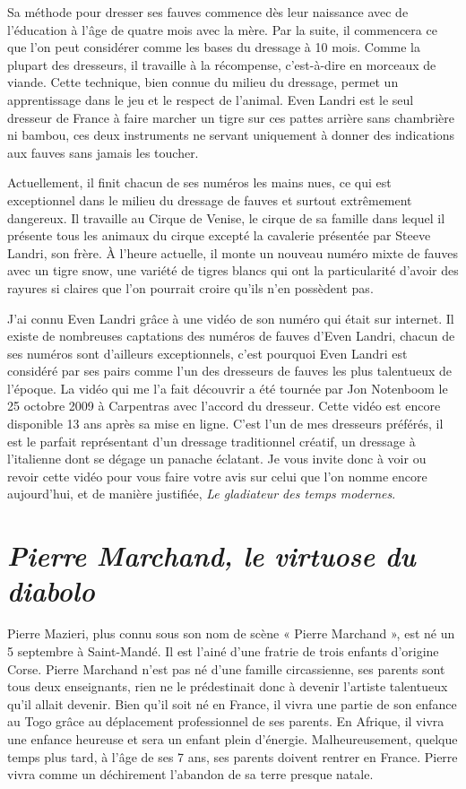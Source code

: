 Sa méthode pour dresser ses fauves commence dès leur naissance avec de l'éducation à l'âge de quatre mois avec la mère. Par la suite, il commencera ce que l'on peut considérer comme les bases du dressage à 10 mois. Comme la plupart des dresseurs, il travaille à la récompense, c'est-à-dire en morceaux de viande. Cette technique, bien connue du milieu du dressage, permet un apprentissage dans le jeu et le respect de l'animal. Even Landri est le seul dresseur de France à faire marcher un tigre sur ces pattes arrière sans chambrière ni bambou, ces deux instruments ne servant uniquement à donner des indications aux fauves sans jamais les toucher.

Actuellement, il finit chacun de ses numéros les mains nues, ce qui est exceptionnel dans le milieu du dressage de fauves et surtout extrêmement dangereux. Il travaille au Cirque de Venise, le cirque de sa famille dans lequel il présente tous les animaux du cirque excepté la cavalerie présentée par Steeve Landri, son frère. À l'heure actuelle, il monte un nouveau numéro mixte de fauves avec un tigre snow, une variété de tigres blancs qui ont la particularité d'avoir des rayures si claires que l'on pourrait croire qu'ils n'en possèdent pas.

J'ai connu Even Landri grâce à une vidéo de son numéro qui était sur internet. Il existe de nombreuses captations des numéros de fauves d'Even Landri, chacun de ses numéros sont d'ailleurs exceptionnels, c'est pourquoi Even Landri est considéré par ses pairs comme l'un des dresseurs de fauves les plus talentueux de l'époque. La vidéo qui me l'a fait découvrir a été tournée par Jon Notenboom le 25 octobre 2009 à Carpentras avec l'accord du dresseur. Cette vidéo est encore disponible 13 ans après sa mise en ligne. C'est l'un de mes dresseurs préférés, il est le parfait représentant d'un dressage traditionnel créatif, un dressage à l'italienne dont se dégage un panache éclatant. Je vous invite donc à voir ou revoir cette vidéo pour vous faire votre avis sur celui que l’on nomme encore aujourd'hui, et de manière justifiée, \textit{Le gladiateur des temps modernes}.

\section*{\textit{Pierre Marchand, le virtuose du diabolo}}
{}

Pierre Mazieri, plus connu sous son nom de scène « Pierre Marchand », est né un 5 septembre à Saint-Mandé. Il est l'ainé d'une fratrie de trois enfants d'origine Corse. Pierre Marchand n'est pas né d'une famille circassienne, ses parents sont tous deux enseignants, rien ne le prédestinait donc à devenir l'artiste talentueux qu'il allait devenir. Bien qu'il soit né en France, il vivra une partie de son enfance au Togo grâce au déplacement professionnel de ses parents. En Afrique, il vivra une enfance heureuse et sera un enfant plein d'énergie. Malheureusement, quelque temps plus tard, à l'âge de ses 7 ans, ses parents doivent rentrer en France. Pierre vivra comme un déchirement l'abandon de sa terre presque natale.

